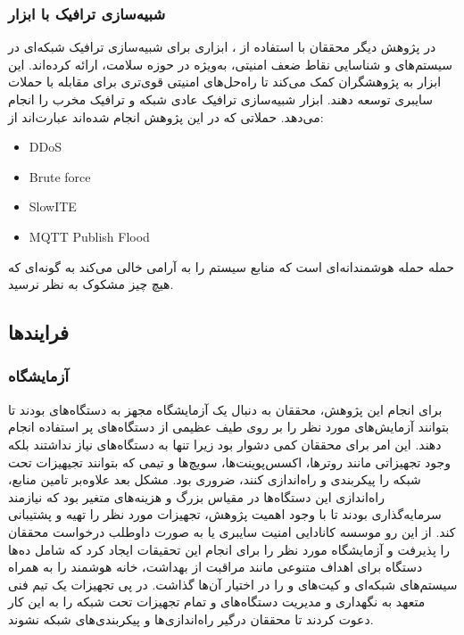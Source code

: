 \subsubsection{شبیه‌سازی ترافیک با ابزار }

در پژوهش دیگر \cite{hussain2021framework} محققان با استفاده از ،
ابزاری برای شبیه‌سازی ترافیک شبکه‌ای در سیستم‌های  و شناسایی نقاط ضعف
امنیتی، به‌ویژه در حوزه سلامت، ارائه کرده‌اند.  این ابزار به پژوهشگران کمک
می‌کند تا راه‌حل‌های امنیتی قوی‌تری برای مقابله با حملات سایبری توسعه دهند.
ابزار  شبیه‌سازی ترافیک عادی شبکه و ترافیک مخرب را انجام می‌دهد.
حملاتی که در این پژوهش انجام شده‌اند عبارت‌اند از:

\begin{LTR}
    \begin{itemize}
        \item DDoS
        \item Brute force
        \item SlowITE
        \item MQTT Publish Flood
    \end{itemize}
\end{LTR}

حمله  حمله هوشمندانه‌ای است که منابع سیستم را به آرامی خالی می‌کند
به گونه‌ای که هیچ چیز مشکوک به نظر نرسید.

\subsection{فرایند‌ها}

\subsubsection{آزمایشگاه }

برای انجام این پژوهش، محققان به دنبال یک آزمایشگاه مجهز به دستگاه‌های 
بودند تا بتوانند آزمایش‌های مورد نظر را بر روی طیف عظیمی از دستگاه‌های پر
استفاده انجام دهند. این امر برای محققان کمی دشوار بود زیرا تنها به دستگاه‌های
 نیاز نداشتند بلکه وجود تجهیزاتی مانند روتر‌ها، اکسس‌پوینت‌ها، سویچ‌ها و
تیمی که بتوانند تجیهیزات تحت شبکه را پیکربندی و راه‌اندازی کنند، ضروری بود. مشکل
بعد علاوه‌بر تامین منابع، راه‌اندازی این دستگاه‌ها در مقیاس بزرگ و هزینه‌های
متغیر بود که نیازمند سرمایه‌گذاری بودند تا با وجود اهمیت پژوهش، تجهیزات مورد نظر
را تهیه و پشتیبانی کند. از این رو موسسه کانادایی امنیت سایبری یا  به
صورت داوطلب درخواست محققان را پذیرفت و آزمایشگاه مورد نظر را برای انجام این
تحقیقات ایجاد کرد که شامل ده‌ها دستگاه  برای اهداف متنوعی مانند مراقبت
از بهداشت، خانه هوشمند را به همراه سیستم‌های شبکه‌ای و کیت‌های  و
 را در اختیار آن‌ها گذاشت. در پی تجهیزات یک تیم فنی متعهد به نگهداری و
مدیریت دستگاه‌های  و تمام تجهیزات تحت شبکه را به این کار دعوت کردند تا
محققان درگیر راه‌اندازی‌ها و پیکربندی‌های شبکه نشوند.

